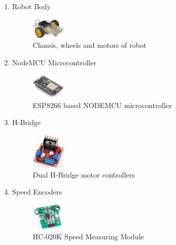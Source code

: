 \documentclass[conference]{IEEEtran}
\begin{document}
    \begin{enumerate}
        \item Robot Body
        \begin{figure}[H]
        \centering
        \captionsetup{justification=centering}
        \centering
            \includegraphics[width=0.15\textwidth]{chasis.jpg}
            \caption{Chassis, wheels and motors of robot \cite{Chassis}}
        \end{figure}

        \item NodeMCU Microcontroller
        \begin{figure}[H]
        \centering
        \captionsetup{justification=centering}
        \centering
            \includegraphics[width=0.15\textwidth]{Microcontroller.jpg}
            \caption{ESP8266 based NODEMCU microcontroller \cite{Microcontroller}}
        \end{figure}

        \item H-Bridge
        \begin{figure}[H]
        \centering
        \captionsetup{justification=centering}
        \centering
            \includegraphics[width=0.15\textwidth]{hbrridge.jpg}
            \caption{Dual H-Bridge motor controllers \cite{HB}}
        \end{figure}

        \item Speed Encoders
        \begin{figure}[H]
        \centering
        \captionsetup{justification=centering}
        \centering
            \includegraphics[width=0.15\textwidth]{enc.png}
            \caption{HC-020K Speed Measuring Module \cite{enc}}
        \end{figure}


\end{enumerate}
\end{document}
